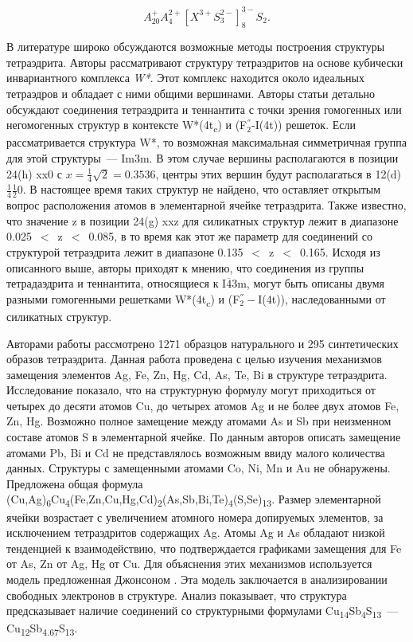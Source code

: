 \begin{equation}
  \label{eq:equation3}
  A^+_{20}A^{2+}_4[X^{3+}S^{2-}_{3}]^{3-}_{8}S_2.
\end{equation}



В литературе широко обсуждаются возможные методы построения структуры тетраэдрита. Авторы \cite{Koch_1981} рассматривают структуру тетраэдритов на основе кубически инвариантного комплекса  \textit{W*}. Этот комплекс находится около идеальных тетраэдров и обладает с ними общими вершинами.
Авторы статьи детально обсуждают соединения тетраэдрита и теннантита с точки зрения гомогенных или негомогенных структур в контексте W*(4t\textsubscript{c}) и (F$^{''}_{2}$-I(4t)) решеток.
Если рассматривается структура W*, то возможная максимальная симметричная группа для этой структуры~--- Im3m. В этом случае вершины располагаются в позиции 24(h) xx0 с $x = \frac{1}{4}\sqrt{2} = 0.3536$, центры этих вершин будут располагаться в 12(d) $\frac{1}{4}\frac{1}{2}0$.
В настоящее время таких структур не найдено, что оставляет открытым вопрос расположения атомов в элементарной ячейке тетраэдрита.
Также известно, что значение  z в позиции 24(g) xxz для силикатных структур лежит в диапазоне 0.025~$<$~z~$<$~0.085, в то время как этот же параметр для соединений со структурой тетраэдрита лежит в диапазоне 0.135~$<$~z~$<$~0.165.
Исходя из описанного выше, авторы приходят к мнению, что соединения из группы тетрадаэдрита и теннантита, относящиеся к I$\overline{\!4}$3m, могут быть описаны двумя разными гомогенными решетками W*(4t\textsubscript{c}) и (F$^{''}_{2}-$I(4t)), наследованными от силикатных структур.


Авторами работы \cite{Johnson1986} рассмотрено 1271 образцов натурального  и 295 синтетических образов тетраэдрита. Данная работа проведена с целью изучения механизмов замещения элементов Ag, Fe, Zn, Hg, Cd, As, Te, Bi в структуре тетраэдрита. Исследование показало, что на структурную формулу могут приходиться от четырех до десяти атомов Cu,  до четырех атомов Ag и не более двух атомов Fe, Zn, Hg. Возможно полное замещение между атомами As и Sb при неизменном составе атомов S в элементарной ячейке.
По данным авторов описать замещение атомами Pb, Bi и Cd не представлялось возможным ввиду малого количества данных. Структуры с замещенными атомами Co, Ni, Mn и Au не обнаружены. Предложена общая формула (Cu,Ag)\textsubscript{6}Cu\textsubscript{4}(Fe,Zn,Cu,Hg,Cd)\textsubscript{2}(As,Sb,Bi,Te)\textsubscript{4}(S,Se)\textsubscript{13}. Размер элементарной ячейки возрастает с увеличением атомного номера допируемых элементов, за исключением тетраэдритов содержащих Ag. Атомы Ag и As обладают низкой тенденцией к взаимодействию, что подтверждается графиками замещения для Fe от As, Zn от Ag, Hg от Cu. Для объяснения этих механизмов используется модель предложенная Джонсоном \cite{johnson1983brillouin}. Эта модель заключается в анализировании свободных электронов в структуре. Анализ показывает, что структура предсказывает наличие соединений со структурными формулами  Cu\textsubscript{14}Sb\textsubscript{4}S\textsubscript{13}~--- Cu\textsubscript{12}Sb\textsubscript{4.67}S\textsubscript{13}.

